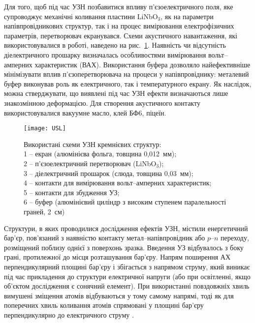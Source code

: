 Для того, щоб під час УЗН позбавитися впливу п'єзоелектричного поля, яке супроводжує механічні коливання пластини LiNbO$_3$,  як на параметри напівпровідникових структур, так і на процес вимірювання електрофізичних параметрів,
перетворювач екранувався.
Схеми акустичного навантаження, які використовувалися в роботі, наведено на рис.~\ref{figUSL}.
Наявність чи відсутність діелектричного прошарку визначалась особливостями вимірювання вольт--амперних характеристик (ВАХ).
Використання буфера дозволяло найефективніше мінімізувати вплив п'єзоперетворювача на процеси у напівпровіднику:
металевий буфер виконував роль як електричного, так і температурного екрану.
Як наслідок, можна стверджувати, що виявлені під час УЗН ефекти визначаються лише знакозмінною деформацією.
Для створення акустичного контакту використовувалися вакуумне масло, клей БФ6, піцеїн.

\begin{figure}
\center
\texttt{[image: USL]}%
\caption{\label{figUSL}
Використані схеми УЗН кремнієвих структур: \protect\\
1 --  екран (алюмінієва фольга, товщина 0,012~мм);\protect\\
2 -- п'єзоелектричний перетворювач (LiNbO$_3$);\protect\\
3 -- діелектричний прошарок (слюда, товщина 0,03~мм);\protect\\
4 -- контакти для вимірювання вольт--амперних характеристик;\protect\\
5 -- контакти для збудження УЗ;\protect\\
6 -- буфер (алюмінієвий циліндр з високим ступенем паралельності граней, 2~см)
}
\end{figure}



Структури, в яких проводилися дослідження ефектів УЗН, містили енергетичний бар'єр, пов'язаний з наявністю контакту метал--напівпровідник або $p$--$n$ переходу, розміщений поблизу однієї з поверхонь зразка.
Введення УЗ відбувалось з боку грані, протилежної до місця розташування бар'єру.
 Напрям поширення АХ перпендикулярний площині бар'єру і збігається з напрямом струму, який виникає під час прикладення до структури електричної напруги (або при освітленні, якщо об'єктом дослідження є сонячний елемент).
  При використанні повздовжніх хвиль вимушені зміщення атомів відбуваються у тому самому напрямі, тоді як для поперечних хвиль коливання атомів спрямовані у площині бар'єру перпендикулярно до електричного струму .


